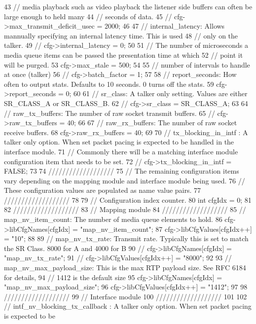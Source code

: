 \begin{DoxyCode}
43     // media playback such as video playback the listener side buffers can often be large enough to held
       many
44     // seconds of data.
45     // cfg->max\_transmit\_deficit\_usec = 2000;
46 
47     // internal\_latency: Allows mannually specifying an internal latency time. This is used
48     // only on the talker.
49     //  cfg->internal\_latency = 0;
50 
51     // The number of microseconds a media queue items can be passed the presentation time at which
52     // point it will be purged.
53     cfg->max\_stale = 500;
54 
55     // number of intervals to handle at once (talker)
56     // cfg->batch\_factor = 1;
57 
58     // report\_seconds: How often to output stats. Defaults to 10 seconds. 0 turns off the stats. 
59     cfg->report\_seconds = 0;
60 
61     // sr\_class: A talker only setting. Values are either SR\_CLASS\_A or SR\_CLASS\_B.
62     // cfg->sr\_class = SR\_CLASS\_A;
63 
64     // raw\_tx\_buffers: The number of raw socket transmit buffers.
65     // cfg->raw\_tx\_buffers = 40;
66 
67     // raw\_rx\_buffers: The number of raw socket receive buffers.
68     cfg->raw\_rx\_buffers = 40;
69 
70     // tx\_blocking\_in\_intf : A talker only option. When set packet pacing is expected to be handled in the
       interface module.
71     // Commonly there will be a matching interface module configuration item that needs to be set.
72     // cfg->tx\_blocking\_in\_intf = FALSE;
73 
74     ///////////////////
75     // The remaining configuration items vary depending on the mapping module and interface module being
       used.
76     // These configuration values are populated as name value pairs.
77     ///////////////////
78 
79     // Configuration index counter.
80     int cfgIdx = 0;
81 
82     ///////////////////
83     // Mapping module
84     ///////////////////
85     // map\_nv\_item\_count: The number of media queue elements to hold.
86     cfg->libCfgNames[cfgIdx] = "map\_nv\_item\_count";
87     cfg->libCfgValues[cfgIdx++] = "10";
88 
89     // map\_nv\_tx\_rate: Transmit rate. Typically this is set to match the SR Class. 8000 for A and 4000 for
       B
90     // cfg->libCfgNames[cfgIdx] = "map\_nv\_tx\_rate";
91     // cfg->libCfgValues[cfgIdx++] = "8000";
92 
93     // map\_nv\_max\_payload\_size: This is the max RTP payload size. See RFC 6184 for details,
94     // 1412 is the default size
95     cfg->libCfgNames[cfgIdx] = "map\_nv\_max\_payload\_size";
96     cfg->libCfgValues[cfgIdx++] = "1412";
97 
98     ///////////////////
99     // Interface module
100     ///////////////////
101 
102     // intf\_nv\_blocking\_tx\_callback : A talker only option. When set packet pacing is expected to be

\end{DoxyCode}
